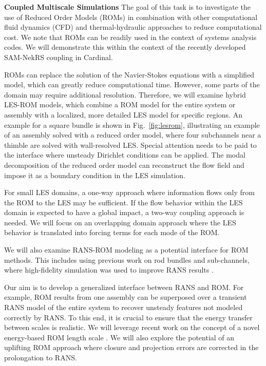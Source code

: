 

\noindent \textbf{Coupled Multiscale Simulations}
The goal of this task is to investigate the use of Reduced Order Models (ROMs)
in combination with other computational fluid dynamics (CFD) and
thermal-hydraulic approaches to reduce computational cost. We note that ROMs
can be readily used in the context of systems analysis codes. We will
demonstrate this within the context of the recently developed SAM-NekRS
coupling in Cardinal.

ROMs can replace the solution of the Navier-Stokes equations with a simplified
model, which can greatly reduce computational time. However, some parts of the
domain may require additional resolution. Therefore, we will examine hybrid
LES-ROM models, which combine a ROM model for the entire system or assembly
with a localized, more detailed LES model for specific regions. An example for
a square bundle is shown in Fig.~\ref{fig:lesrom}, illustrating an example
of an assembly solved with a reduced order model, where four subchannels near a
thimble are solved with wall-resolved LES. Special attention needs to be paid
to the interface where unsteady Dirichlet conditions can be applied. The modal
decomposition of the reduced order model can reconstruct the flow field and
impose it as a boundary condition in the LES simulation.

For small LES domains, a one-way approach where information flows only from the
ROM to the LES may be sufficient. If the flow behavior within the LES domain is
expected to have a global impact, a two-way coupling approach is needed. We
will focus on an overlapping domain approach where the LES behavior is
translated into forcing terms for each mode of the ROM.

We will also examine RANS-ROM modeling as a potential interface for ROM
methods. This includes using previous work on rod bundles and sub-channels,
where high-fidelity simulation was used to improve RANS results
\cite{martinez2019a}.

Our aim is to develop a generalized interface between RANS and ROM. For
example, ROM results from one assembly can be superposed over a transient RANS
model of the entire system to recover unsteady features not modeled correctly
by RANS. To this end, it is crucial to ensure that the energy transfer between
scales is realistic. We will leverage recent work on the concept of a novel
energy-based ROM length scale \cite{mou2021}. We will also explore the
potential of an uplifting ROM approach \cite{ahmed2020} where closure and
projection errors are corrected in the prolongation to RANS.

